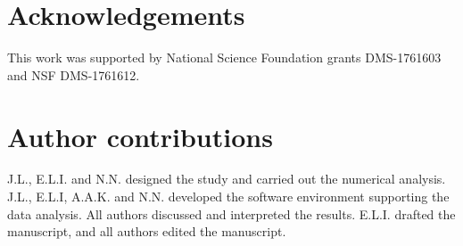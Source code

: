 \documentclass[12pt]{article}\usepackage[]{graphicx}\usepackage[]{xcolor}
\begin{document}
\section*{Acknowledgements}
This work was supported by National Science Foundation grants DMS-1761603 and NSF DMS-1761612.

\section*{Author contributions}
J.L., E.L.I. and N.N. designed the study and carried out the numerical analysis. J.L., E.L.I, A.A.K. and N.N. developed the software environment supporting the data analysis. All authors discussed and interpreted the results. E.L.I. drafted the manuscript, and all authors edited the manuscript.




\end{document}
